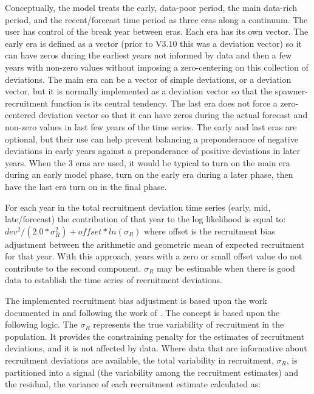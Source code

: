 Conceptually, the model treats the early, data-poor period, the main data-rich period, and the recent/forecast time period as three eras along a continuum. The user has control of the break year between eras. Each era has its own vector. The early era is defined as a vector (prior to V3.10 this was a deviation vector) so it can have zeros during the earliest years not informed by data and then a few years with non-zero values without imposing a zero-centering on this collection of deviations. The main era can be a vector of simple deviations, or a deviation vector, but it is normally implemented as a deviation vector so that the spawner-recruitment function is its central tendency. The last era does not force a zero-centered deviation vector so that it can have zeros during the actual forecast and non-zero values in last few years of the time series. The early and last eras are optional, but their use can help prevent balancing a preponderance of negative deviations in early years against a preponderance of positive deviations in later years. When the 3 eras are used, it would be typical to turn on the main era during an early model phase, turn on the early era during a later phase, then have the last era turn on in the final phase.

\hypertarget{RecBias}{}
For each year in the total recruitment deviation time series (early, mid, late/forecast) the contribution of that year to the log likelihood is equal to: $dev^2/(2.0*\sigma^2_R)+offset*ln(\sigma_R)$ where offset is the recruitment bias adjustment between the arithmetic and geometric mean of expected recruitment for that year. With this approach, years with a zero or small offset value do not contribute to the second component. $\sigma_R$ may be estimable when there is good data to establish the time series of recruitment deviations.

The implemented recruitment bias adjustment is based upon the work documented in \citet{methot-adjusting-2011} and following the work of \citet{maunder-estimation-2003}. The concept is based upon the following logic. The $\sigma_R$ represents the true variability of recruitment in the population. It provides the constraining penalty for the estimates of recruitment deviations, and it is not affected by data. Where data that are informative about recruitment deviations are available, the total variability in recruitment, $\sigma_R$, is partitioned into a signal (the variability among the recruitment estimates) and the residual, the variance of each recruitment estimate calculated as:

